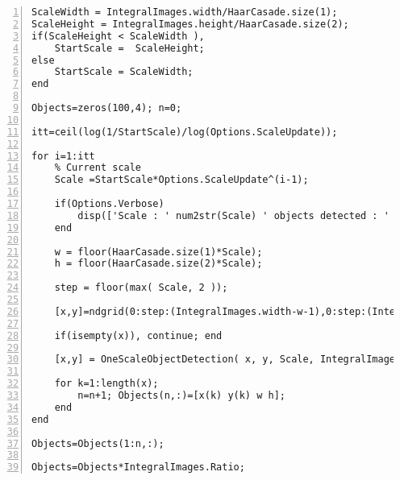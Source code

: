 \begin{lstlisting}[style=Matlab-editor, numbers=left,label={lst:HaarCasadeObjectDetection},captionpos=b, caption={Code \textbf{HaarCasadeObjectDetection.m} }]
ScaleWidth = IntegralImages.width/HaarCasade.size(1);
ScaleHeight = IntegralImages.height/HaarCasade.size(2);
if(ScaleHeight < ScaleWidth ), 
	StartScale =  ScaleHeight; 
else
	StartScale = ScaleWidth;
end

Objects=zeros(100,4); n=0; 

itt=ceil(log(1/StartScale)/log(Options.ScaleUpdate));

for i=1:itt
	% Current scale
	Scale =StartScale*Options.ScaleUpdate^(i-1);    
	
	if(Options.Verbose)
		disp(['Scale : ' num2str(Scale) ' objects detected : ' num2str(n) ])
	end
	
	w = floor(HaarCasade.size(1)*Scale);
	h = floor(HaarCasade.size(2)*Scale);
	
	step = floor(max( Scale, 2 ));
	
	[x,y]=ndgrid(0:step:(IntegralImages.width-w-1),0:step:(IntegralImages.height-h-1)); x=x(:); y=y(:);
	
	if(isempty(x)), continue; end
	
	[x,y] = OneScaleObjectDetection( x, y, Scale, IntegralImages, w, h, HaarCasade);
	
	for k=1:length(x);
		n=n+1; Objects(n,:)=[x(k) y(k) w h];
	end
end

Objects=Objects(1:n,:);

Objects=Objects*IntegralImages.Ratio;
\end{lstlisting}

